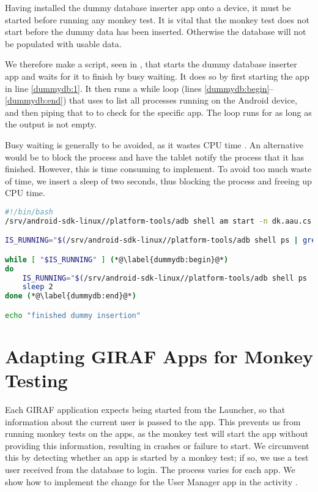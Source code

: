 Having installed the dummy database inserter app onto a device, it must be started before running any monkey test. It is vital that the monkey test does not start before the dummy data has been inserted. Otherwise the database will not be populated with usable data.

We therefore make a script, seen in , that starts the dummy database inserter app and waits for it to finish by busy waiting. It does so by first starting the app in line \ref{dummydb:1}. It then runs a while loop (lines \ref{dummydb:begin}--\ref{dummydb:end}) that uses  to list all processes running on the Android device, and then piping that to  to check for the specific app. The loop runs for as long as the output is not empty.

Busy waiting is generally to be avoided, as it wastes CPU time \parencite[ch.2]{tanenbaum2007}. An alternative would be to block the process and have the tablet notify the process that it has finished. However, this is time consuming to implement. To avoid too much waste of time, we insert a sleep of two seconds, thus blocking the process and freeing up CPU time.

\begin{lstlisting}[language=bash,showstringspaces=false,caption=Bash script which starts and waits for dummy database inserter,label=lst:start_wait_dummy_db_inserter]
#!/bin/bash
/srv/android-sdk-linux//platform-tools/adb shell am start -n dk.aau.cs.giraf.dummydbinserter/dk.aau.cs.giraf.dummydbinserter.MainActivity (*@\label{dummydb:1}@*)

IS_RUNNING="$(/srv/android-sdk-linux//platform-tools/adb shell ps | grep dk.aau.cs.giraf.dummydbinserter)"

while [ "$IS_RUNNING" ] (*@\label{dummydb:begin}@*)
do
    IS_RUNNING="$(/srv/android-sdk-linux//platform-tools/adb shell ps | grep dk.aau.cs.giraf.dummydbinserter)"
    sleep 2
done (*@\label{dummydb:end}@*)

echo "finished dummy insertion"
\end{lstlisting}

\section{Adapting GIRAF Apps for Monkey Testing}\label{sec:adapting_apps_for_monkey_testing}
Each GIRAF application expects being started from the Launcher, so that information about the current user is passed to the app. This prevents us from running monkey tests on the apps, as the monkey test will start the app without providing this information, resulting in crashes or failure to start. We circumvent this by detecting whether an app is started by a monkey test; if so, we use a test user received from the database to login. The process varies for each app. We show how to implement the change for the User Manager app in the activity .

